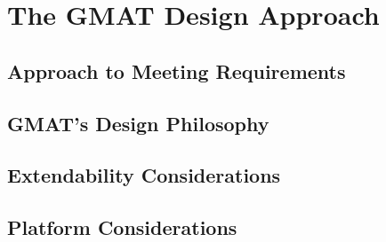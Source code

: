 \chapter{The GMAT Design Approach}

\section{Approach to Meeting Requirements}

\section{GMAT's Design Philosophy}

\section{Extendability Considerations}

\section{Platform Considerations}
